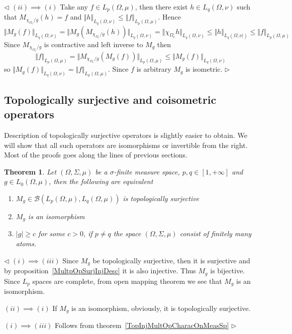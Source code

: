 \documentclass[12pt]{article}
\newtheorem{theorem}{Theorem}[subsection]
\newenvironment{proof}{\par $\triangleleft$}{$\triangleright$}
\begin{document}
\begin{proof}
    $(ii)\implies (i)$ Take any $f\in L_p(\Omega,\mu)$, then there exist
    $h\in L_q(\Omega,\nu)$ such that $M_{\chi_{\Omega_c}/g}(h)=f$ and
    $\Vert h\Vert_{L_q(\Omega,\nu)}\leq \Vert f\Vert_{L_p(\Omega,\mu)}$. Hence
    $$
        \Vert M_g(f)\Vert_{L_q(\Omega,\nu)} =\Vert
        M_g(M_{\chi_{\Omega_c}/g}(h))\Vert_{L_q(\Omega,\nu)} =\Vert
        \chi_{\Omega_c}h\Vert_{L_q(\Omega,\nu)} \leq\Vert
        h\Vert_{L_q(\Omega,\nu|)} \leq\Vert f\Vert_{L_p(\Omega,\mu)}
    $$
    Since $M_{\chi_{\Omega_c}/g}$ is contractive and left inverse to $M_g$ then
    $$
        \Vert f\Vert_{L_p(\Omega,\mu)} =\Vert
        M_{\chi_{\Omega_c}/g}(M_g(f))\Vert_{L_p(\Omega,\mu)} \leq\Vert
        M_g(f)\Vert_{L_q(\Omega,\nu)}
    $$
    so $\Vert M_g(f)\Vert_{L_q(\Omega,\nu)}=\Vert f\Vert_{L_p(\Omega,\mu)}$.
    Since $f$ is arbitrary $M_g$ is isometric.
\end{proof}


\subsection{Topologically surjective and coisometric operators}

Description of topologically surjective operators is slightly easier to obtain.
We will show that all such operators are isomorphisms or invertible from the
right. Most of the proofs goes along the lines of previous sections.

\begin{theorem}\label{TopSurMultOpCharacOnMeasSp} Let $(\Omega,\Sigma,\mu)$ be
    a $\sigma$-finite measure space, $p,q\in[1,+\infty]$ and
    $g\in L_0(\Omega,\mu)$, then the following are equivalent
    \begin{enumerate}[label = (\roman*)]
        \item $M_g\in\mathcal{B}(L_p(\Omega,\mu),L_q(\Omega,\mu))$ is
              topologically surjective

        \item $M_g$ is an isomorphism

        \item $|g|\geq c$ for some $c>0$, if $p\neq q$ the space
              $(\Omega,\Sigma,\mu)$ consist of finitely many atoms.
    \end{enumerate}
\end{theorem}
\begin{proof} $(i)\implies (iii)$ Since $M_g$ be topologically surjective,
    then it is surjective and by proposition~\ref{MultpOpSurjInjDesc} it is
    also injective. Thus $M_g$ is bijective. Since $L_p$ spaces are complete,
    from open mapping theorem we see that $M_g$ is an isomorphism.

    $(ii)\implies (i)$ If $M_g$ is an isomorphism, obviously, it is
    topologically surjective.

    $(i)\implies (iii)$ Follows from theorem~\ref{TopInjMultOpCharacOnMeasSp}
\end{proof}
\end{document}
